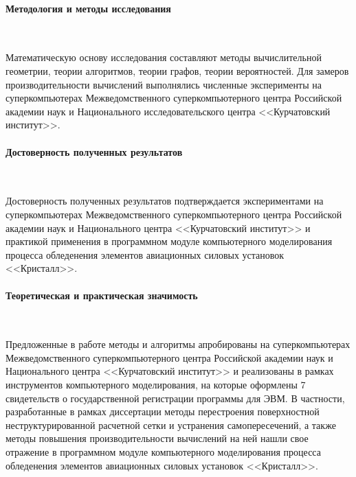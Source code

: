 \documentclass[a4paper,14pt]{extarticle}                     %
\theoremstyle{plain}                                         %
\begin{document}




\paragraph{Методология и методы исследования} \

Математическую основу исследования составляют методы вычислительной геометрии, теории алгоритмов, теории графов, теории вероятностей.
Для замеров производительности вычислений выполнялись численные эксперименты на суперкомпьютерах Межведомственного суперкомпьютерного центра Российской академии наук и Национального исследовательского центра <<Курчатовский институт>>.



\paragraph{Достоверность полученных результатов} \

Достоверность полученных результатов подтверждается экспериментами на суперкомпьютерах Межведомственного суперкомпьютерного центра Российской академии наук и Национального центра <<Курчатовский институт>> и практикой применения в программном модуле компьютерного моделирования процесса обледенения элементов авиационных силовых установок <<Кристалл>>.

\paragraph{Теоретическая и практическая значимость} \



Предложенные в работе методы и алгоритмы апробированы на суперкомпьютерах Межведомственного суперкомпьютерного центра Российской академии наук и Национального центра <<Курчатовский институт>> и реализованы в рамках инструментов компьютерного моделирования, на которые оформлены 7 свидетельств о государственной регистрации программы для ЭВМ.
В частности, разработанные в рамках диссертации методы перестроения поверхностной неструктурированной расчетной сетки и устранения самопересечений, а также методы повышения производительности вычислений на ней нашли свое отражение в программном модуле компьютерного моделирования процесса обледенения элементов авиационных силовых установок <<Кристалл>>.


\end{document}

